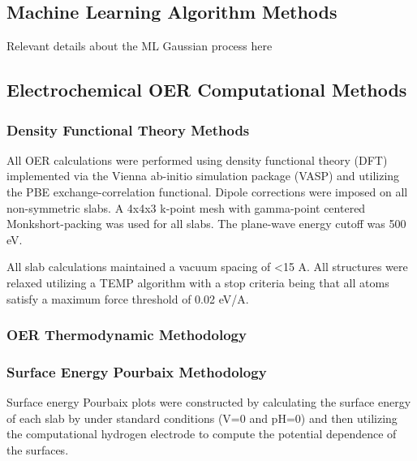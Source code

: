 

\subsection{Machine Learning Algorithm Methods}

Relevant details about the ML Gaussian process here %

\subsection{Electrochemical OER Computational Methods}

\subsubsection{Density Functional Theory Methods}
All OER calculations were performed using density functional theory (DFT) implemented via the Vienna ab-initio simulation package (VASP) and utilizing the PBE exchange-correlation functional.
Dipole corrections were imposed on all non-symmetric slabs.
A 4x4x3 k-point mesh with gamma-point centered Monkshort-packing was used for all slabs.
The plane-wave energy cutoff was 500 eV.


All slab calculations maintained a vacuum spacing of <15 A.
All structures were relaxed utilizing a TEMP algorithm with a stop criteria being that all atoms satisfy a maximum force threshold of 0.02 eV/A.

\subsubsection{OER Thermodynamic Methodology}

\subsubsection{Surface Energy Pourbaix Methodology}
Surface energy Pourbaix plots were constructed by calculating the surface energy of each slab by under standard conditions (V=0 and pH=0) and then utilizing the computational hydrogen electrode to compute the potential dependence of the surfaces.

